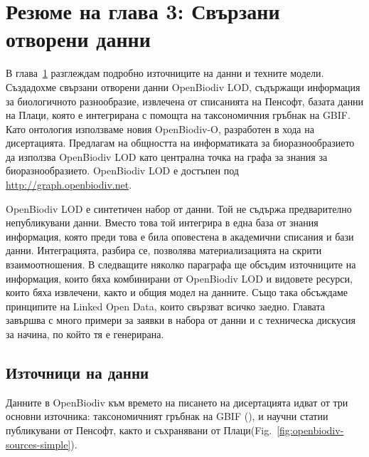 \chapter{Резюме на глава 3: Свързани отворени данни}
\label{chapter-lod}

В глава~\ref{chapter-lod} разглеждам подробно източниците на данни и техните модели. Създадохме свързани отворени данни OpenBiodiv LOD, съдържащи информация за биологичното разнообразие, извлечена от списанията на Пенсофт, базата данни на Плаци, която е интегрирана с помощта на таксономичния гръбнак на GBIF. Като онтология използваме новия \mbox{OpenBiodiv-O}, разработен в хода на дисертацията. Предлагам на общността на информатиката за биоразнообразието да използва OpenBiodiv LOD като централна точка на графа за знания за биоразнообразието. OpenBiodiv LOD е достъпен под \url{http://graph.openbiodiv.net}.

OpenBiodiv LOD е синтетичен набор от данни. Той не съдържа предварително непубликувани данни. Вместо това той интегрира в една база от знания информация, която преди това е била оповестена в академични списания и бази данни. Интеграцията, разбира се, позволява материализацията на скрити взаимоотношения. В следващите няколко параграфа ще обсъдим източниците на информация, които бяха комбинирани от OpenBiodiv LOD и видовете ресурси, които бяха извлечени, както и общия модел на данните. Също така обсъждаме принципите на Linked Open Data, които свързват всичко заедно. Главата завършва с много примери за заявки в набора от данни и с техническа дискусия за начина, по който тя е генерирана.

\section{Източници на данни}

Данните в OpenBiodiv към времето на писането на дисертацията идват от три основни източника: таксономичният гръбнак на GBIF (\cite{gbif_secretariat_gbif_2017-1}), и научни статии публикувани от Пенсофт, както и съхранявани от Плаци(Fig.~\ref{fig:openbiodiv-sources-simple}).


